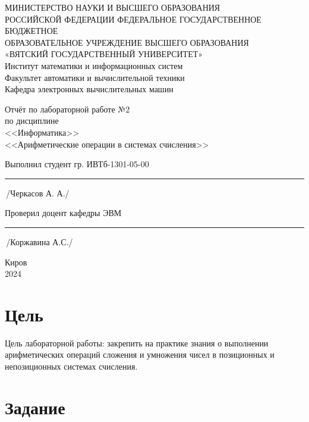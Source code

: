 \documentclass[oneside,a4paper,14pt]{extarticle} %
\begin{document}
    \newpage\thispagestyle{empty}
    \begin{center}
        МИНИСТЕРСТВО НАУКИ И ВЫСШЕГО ОБРАЗОВАНИЯ\\
            РОССИЙСКОЙ ФЕДЕРАЦИИ
            ФЕДЕРАЛЬНОЕ ГОСУДАРСТВЕННОЕ БЮДЖЕТНОЕ\\
            ОБРАЗОВАТЕЛЬНОЕ
            УЧРЕЖДЕНИЕ ВЫСШЕГО ОБРАЗОВАНИЯ\\
            «ВЯТСКИЙ ГОСУДАРСТВЕННЫЙ УНИВЕРСИТЕТ»\\
            Институт математики и информационных систем\\
            Факультет автоматики и вычислительной техники\\
            Кафедра электронных вычислительных машин
    \end{center}
    \vspace{20mm}
    
    \begin{center}
        Отчёт по лабораторной работе №2\\
        по дисциплине\\
        <<Информатика>>\\
        <<Арифметические операции в системах счисления>>\\
    \end{center}
    \vspace{48mm}
    
    Выполнил студент гр. ИВТб-1301-05-00 \hspace{5mm} \rule[-0,5mm]{30mm}{0.15mm}\,/Черкасов А. А./
    
    
    Проверил доцент кафедры ЭВМ \hfill  \rule[-0,5mm]{30mm}{0.15mm}\,/Коржавина А.С./
    
    \vfill
    \begin{center}
        Киров\\
        2024
    \end{center}

    \newpage\thispagestyle{empty}
    
   \section{Цель}
   
Цель лабораторной работы: закрепить на практике знания о выполнении арифметических операций сложения и умножения чисел в позиционных и непозиционных системах счисления.
   
    \section*{Задание}
    
\end{document}
